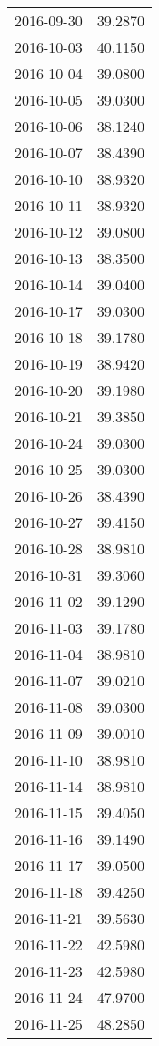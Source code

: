 \begin{tabular}{lr}
2016-09-30 &     39.2870 \\
2016-10-03 &     40.1150 \\
2016-10-04 &     39.0800 \\
2016-10-05 &     39.0300 \\
2016-10-06 &     38.1240 \\
2016-10-07 &     38.4390 \\
2016-10-10 &     38.9320 \\
2016-10-11 &     38.9320 \\
2016-10-12 &     39.0800 \\
2016-10-13 &     38.3500 \\
2016-10-14 &     39.0400 \\
2016-10-17 &     39.0300 \\
2016-10-18 &     39.1780 \\
2016-10-19 &     38.9420 \\
2016-10-20 &     39.1980 \\
2016-10-21 &     39.3850 \\
2016-10-24 &     39.0300 \\
2016-10-25 &     39.0300 \\
2016-10-26 &     38.4390 \\
2016-10-27 &     39.4150 \\
2016-10-28 &     38.9810 \\
2016-10-31 &     39.3060 \\
2016-11-02 &     39.1290 \\
2016-11-03 &     39.1780 \\
2016-11-04 &     38.9810 \\
2016-11-07 &     39.0210 \\
2016-11-08 &     39.0300 \\
2016-11-09 &     39.0010 \\
2016-11-10 &     38.9810 \\
2016-11-14 &     38.9810 \\
2016-11-15 &     39.4050 \\
2016-11-16 &     39.1490 \\
2016-11-17 &     39.0500 \\
2016-11-18 &     39.4250 \\
2016-11-21 &     39.5630 \\
2016-11-22 &     42.5980 \\
2016-11-23 &     42.5980 \\
2016-11-24 &     47.9700 \\
2016-11-25 &     48.2850 \\

\end{tabular}
